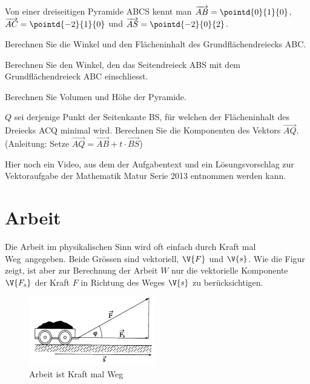 \documentclass[%
11pt,%
twoside,%
titlepage,%
german,%
headsepline%
]{scrartcl}
\theoremstyle{definition}
\theoremstyle{plain}
\begin{document}
\begin{ueb}
Von einer dreiseitigen Pyramide ABCS kennt man $\overrightarrow{AB}=\pointd{0}{1}{0}$, $\overrightarrow{AC}=\pointd{-2}{1}{0}$ und $\overrightarrow{AS}=\pointd{-2}{0}{2}$.
\begin{enumeratea}
\item Berechnen Sie die Winkel und den Flächeninhalt des Grundflächendreiecks ABC.
\item Berechnen Sie den Winkel, den das Seitendreieck ABS mit dem Grundflächendreieck ABC einschliesst.
\item Berechnen Sie Volumen und Höhe der Pyramide.
\item $Q$ sei derjenige Punkt der Seitenkante BS, für welchen der Flächeninhalt des Dreiecks ACQ minimal wird. Berechnen Sie die Komponenten des Vektors $\overrightarrow{AQ}$. (Anleitung: Setze $\overrightarrow{AQ}=\overrightarrow{AB}+t\cdot\overrightarrow{BS}$)
\end{enumeratea}

\end{ueb}

\begin{ueb}
Hier
noch ein Video, aus dem der Aufgabentext und ein Lösungsvorschlag zur Vektoraufgabe der Mathematik Matur Serie 2013 entnommen werden kann.
\end{ueb}

\section{Arbeit}
Die Arbeit im physikalischen Sinn wird oft einfach durch \glqq Kraft mal Weg\grqq\ angegeben. Beide Grössen sind vektoriell, $\V{F}$ und $\V{s}$. Wie die Figur zeigt, ist aber zur Berechnung der Arbeit $W$ nur die vektorielle Komponente $\V{F_s}$ der Kraft $F$ in Richtung des Weges $\V{s}$ zu berücksichtigen.

\begin{figure}[ht]
\begin{center}
\includegraphics[width=0.49\textwidth]{pictures/arbeit}
\end{center}
\caption{Arbeit ist \glqq Kraft mal Weg\grqq}
\end{figure}
\end{document}
